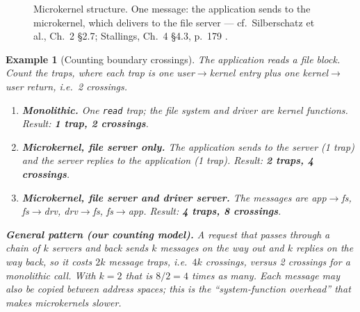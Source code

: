 \documentclass[11pt]{article}
\newtheorem{example}{Example}
\begin{document}
\begin{figure}[h]
\centering
{}
\caption{Microkernel structure. One message: the application sends to the
microkernel, which delivers to the file server --- cf.\ Silberschatz et al.,
Ch.~2 \S2.7; Stallings, Ch.~4 \S4.3, p.~179
\cite{StallingsOS_internals_design_principles}.}
\label{fig:micro}
\end{figure}

\begin{example}[Counting boundary crossings]
The application reads a file block. Count the traps, where each trap is one
user$\to$kernel entry plus one kernel$\to$user return, i.e.\ 2 crossings.
\begin{enumerate}
  \item \textbf{Monolithic.} One \texttt{read} trap; the file system and driver
        are kernel functions. Result: \textbf{1 trap, 2 crossings}.
  \item \textbf{Microkernel, file server only.} The application sends to the
        server (1 trap) and the server replies to the application (1 trap).
        Result: \textbf{2 traps, 4 crossings}.
  \item \textbf{Microkernel, file server and driver server.} The messages are
        app$\to$fs, fs$\to$drv, drv$\to$fs, fs$\to$app. Result:
        \textbf{4 traps, 8 crossings}.
\end{enumerate}
\textbf{General pattern (our counting model).} A request that passes through a
chain of $k$ servers and back sends $k$ messages on the way out and $k$ replies
on the way back, so it costs $2k$ message traps, i.e.\ $4k$ crossings, versus 2
crossings for a monolithic call. With $k=2$ that is $8/2 = 4$ times as many.
Each message may also be copied between address spaces; this is the
``system-function overhead'' that makes microkernels slower.
\end{example}
\end{document}
